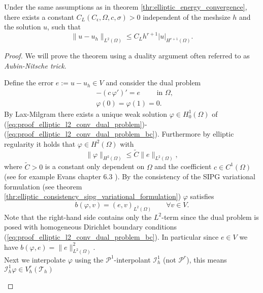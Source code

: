 \begin{theorem}[$L^2$-convergence]
	\label{thr:elliptic_l2_convergence}
	Under the same assumptions as in theorem \ref{thr:elliptic_energy_convergence}, there exists a constant $C_{L}(C_{\epsilon}, \Omega, c, \sigma) > 0$ 
	independent of the meshsize $h$ and the solution $u$, such that
	\begin{equation}
		\label{eq:elliptic_l2_convergence_rate}
		\|u - u_h \|_{L^2(\Omega)} \leq C_{L} h^{r+1} |u|_{H^{r+1}(\Omega)}.
	\end{equation}
\end{theorem}
\begin{proof}
	We will prove the theorem using a duality argument often referred to as \textit{Aubin-Nitsche trick}.
	\begin{proofstep}
		Define the error $e := u - u_h \in V$ and consider the dual problem 
		\begin{align}
			&-(c \, \varphi ')' = e \qquad \text{ in }\Omega \label{eq:proof_elliptic_l2_conv_dual_problem}, \\
			&\varphi(0) = \varphi(1) = 0 \label{eq:proof_elliptic_l2_conv_dual_problem_bc}.
		\end{align}
		By Lax-Milgram there exists a unique weak solution $\varphi \in H^1_0(\Omega)$ of (\ref{eq:proof_elliptic_l2_conv_dual_problem})-(\ref{eq:proof_elliptic_l2_conv_dual_problem_bc}).
		Furthermore by elliptic regularity it holds that $\varphi \in H^2(\Omega)$ with
		\begin{equation}
			\label{eq:proof_elliptic_l2_conv_elliptic_regularity}
			\| \varphi \|_{H^2(\Omega)} \leq \tilde{C} \|e \|_{L^2(\Omega)},
		\end{equation}
		where $\tilde{C} > 0$ is a constant only dependent on $\Omega$ and the coefficient $c \in C^1(\Omega)$(see for example Evans chapter 6.3 \cite{EvansPDE}).
		By the consistency of the SIPG variational formulation (see theorem \ref{thr:elliptic_consistency_sipg_variational_formulation}) $\varphi$ satisfies
		\begin{equation*}
			b(\varphi, v) = (e, v)_{L^2(\Omega)} \qquad \forall v \in V.
		\end{equation*}
		Note that the right-hand side contains only the $L^2$-term since the dual problem is posed with homogeneous Dirichlet boundary conditions (\ref{eq:proof_elliptic_l2_conv_dual_problem_bc}).
		In particular since $e \in V$ we have $b(\varphi, e) = \| e \|_{L^2(\Omega)}^2$. \\
		Next we interpolate $\varphi$ using the $\mathcal{P}^1$-interpolant $\mathcal{I}_h^1$ (not $\mathcal{P}^r$), this means $\mathcal{I}_h^1 \varphi \in V_h^r(\mathcal{T}_h)$

\end{proofstep}
\end{proof}
